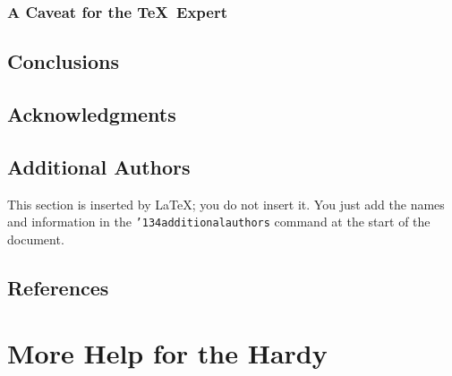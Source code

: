 \documentclass{acm_proc_article-sp}
\begin{document}
\subsubsection*{A Caveat for the \TeX\ Expert}
\subsection{Conclusions}
\subsection{Acknowledgments}
\subsection{Additional Authors}
This section is inserted by \LaTeX; you do not insert it.
You just add the names and information in the
\texttt{{\char'134}additionalauthors} command at the start
of the document.
\subsection{References}

\section{More Help for the Hardy}

\balancecolumns
\end{document}
